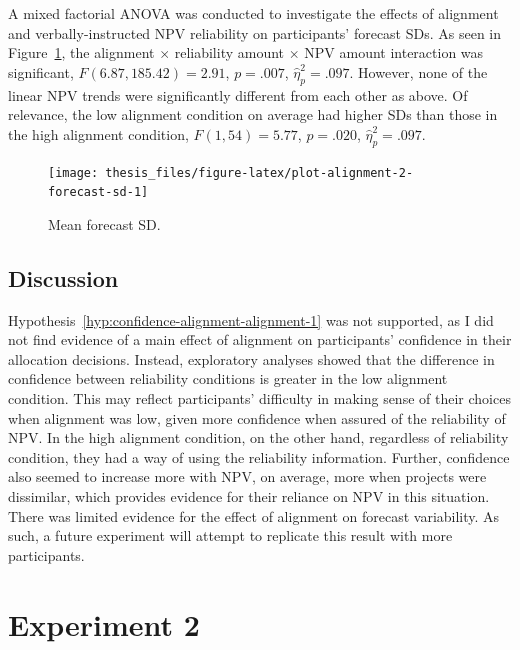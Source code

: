 \documentclass[a4paper, nobind, dvipsnames]{templates/ociamthesis}
\theoremstyle{definition}
\theoremstyle{definition}
\theoremstyle{definition}
\theoremstyle{definition}
\theoremstyle{remark}
\begin{document}
A mixed factorial ANOVA was conducted to investigate the effects of alignment
and verbally-instructed NPV reliability on participants' forecast SDs. As seen
in Figure~\ref{fig:plot-alignment-2-forecast-sd}, the alignment \(\times\)
reliability amount \(\times\) NPV amount interaction was significant,
\(F(6.87, 185.42) = 2.91\), \(p = .007\), \(\hat{\eta}^2_p = .097\).
However, none of the linear NPV trends were significantly different from each
other as above. Of relevance, the low alignment condition on average had higher
SDs than those in the high alignment condition,
\(F(1, 54) = 5.77\), \(p = .020\), \(\hat{\eta}^2_p = .097\).



\begin{figure}
\texttt{[image: thesis\_files/figure-latex/plot-alignment-2-forecast-sd-1]} \caption{Mean forecast SD.}\label{fig:plot-alignment-2-forecast-sd}
\end{figure}

\hypertarget{discussion-8}{%
\subsection{Discussion}\label{discussion-8}}

Hypothesis~\ref{hyp:confidence-alignment-alignment-1} was not supported, as I
did not find evidence of a main effect of alignment on participants' confidence
in their allocation decisions. Instead, exploratory analyses showed that the
difference in confidence between reliability conditions is greater in the low
alignment condition. This may reflect participants' difficulty in making sense
of their choices when alignment was low, given more confidence when assured of
the reliability of NPV. In the high alignment condition, on the other hand,
regardless of reliability condition, they had a way of using the reliability
information. Further, confidence also seemed to increase more with NPV, on
average, more when projects were dissimilar, which provides evidence for their
reliance on NPV in this situation. There was limited evidence for the effect of
alignment on forecast variability. As such, a future experiment will attempt to
replicate this result with more participants.

\hypertarget{alignment-3-appendix}{%
\section{Experiment 2}\label{alignment-3-appendix}}
\end{document}
